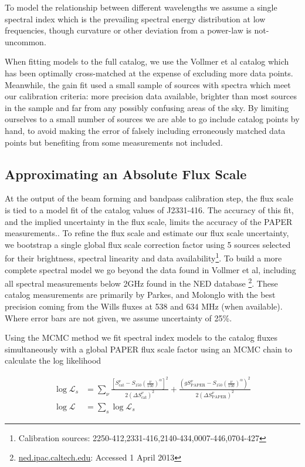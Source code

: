 \documentclass[preprint]{aastex}
\newcommand{\PAPER}{\mathrm{PAPER}}
\begin{document}
To model the relationship between different wavelengths we assume a single spectral index
which is the prevailing spectral energy distribution at low frequencies, 
though curvature or other
deviation from a power-law is not-uncommon.  

When fitting models to the full catalog, we use the Vollmer et al
catalog which has been optimally cross-matched at the expense of excluding more data points.
Meanwhile, the gain fit used a small sample of
sources with spectra which meet our calibration criteria: more precision data available,
brighter than most sources in the sample and far from any possibly confusing areas of
the sky. 
By limiting ourselves to a small number of sources we are able to go include catalog points by hand,
to avoid making the error of falsely including erroneously matched 
data points but benefiting from some measurements not included. 


\subsection{Approximating an Absolute Flux Scale}
\label{sec:flux_scale}

At the output of the beam forming and bandpass calibration step, the flux scale
 is tied to a model fit of the catalog values of
J2331-416. The accuracy of this fit, and the implied uncertainty in the flux
scale, limits the accuracy of the PAPER measurements..  To refine the flux
scale and estimate our flux scale uncertainty, we bootstrap a single global flux scale 
correction factor using 5
sources selected for their brightness, spectral linearity and data
availability\footnote{Calibration sources:
2250-412,2331-416,2140-434,0007-446,0704-427}. To build a more complete
spectral model we go beyond the data found in Vollmer et al, including all spectral
measurements below 2GHz found in the NED database \footnote{\url{ned.ipac.caltech.edu}: Accessed 1 April 2013}.  These catalog measurements
are primarily by Parkes, and Molonglo with the best precision coming from the
Wills fluxes at 538 and 634 MHz (when available). Where error bars are not
given, we assume uncertainty of 25\%. 

Using the MCMC method we fit spectral index models to the catalog fluxes
 simultaneously with a global PAPER flux scale factor using  an MCMC chain to calculate the log likelihood

\begin{align}
\log\mathcal{L}_s &= \sum_{\nu}\frac{ \left[S_\textrm{cat}^{\nu}  - S_{150}  \left(\frac{\nu}{150}\right)^\alpha\right]^2}{2(\Delta S_\textrm{cat}^\nu)^2} +
\frac{ (g S_\PAPER^{\nu}  - S_{150}\left(\frac{\nu}{150}\right)^\alpha)^2}{2(\Delta S_\PAPER^\nu)^2} \nonumber \\
\log\mathcal{L} &= \sum_{s} \log\mathcal{L}_s
\end{align}
\end{document}
